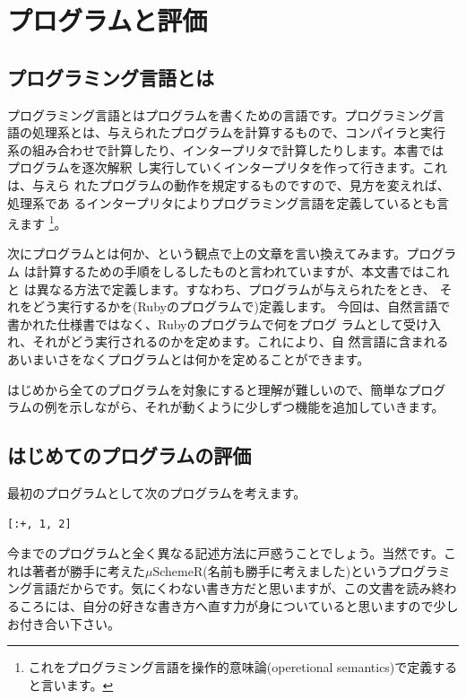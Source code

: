 \chapter{プログラムと評価\hspace{-3mm}}

\section{プログラミング言語とは}

プログラミング言語とはプログラムを書くための言語です。プログラミング言
語の処理系とは、与えられたプログラムを計算するもので、コンパイラと実行
系の組み合わせで計算したり、インタープリタで計算したりします。本書では
プログラムを逐次解釈
し実行していくインタープリタを作って行きます。これは、与えら
れたプログラムの動作を規定するものですので、見方を変えれば、処理系であ
るインタープリタによりプログラミング言語を定義しているとも言えます
\footnote{これをプログラミング言語を操作的意味論(operetional semantics)で定義すると言います。}。

次にプログラムとは何か、という観点で上の文章を言い換えてみます。プログラム
は計算するための手順をしるしたものと言われていますが、本文書ではこれと
は異なる方法で定義します。すなわち、プログラムが与えられたをとき、
それをどう実行するかを(Rubyのプログラムで)定義します。
今回は、自然言語で書かれた仕様書ではなく、Rubyのプログラムで何をプログ
ラムとして受け入れ、それがどう実行されるのかを定めます。これにより、自
然言語に含まれるあいまいさをなくプログラムとは何かを定めることができます。

はじめから全てのプログラムを対象にすると理解が難しいので、簡単なプログ
ラムの例を示しながら、それが動くように少しずつ機能を追加していきます。

\section{はじめてのプログラムの評価}

最初のプログラムとして次のプログラムを考えます。

\begin{lstlisting}
[:+, 1, 2]
\end{lstlisting}

今までのプログラムと全く異なる記述方法に戸惑うことでしょう。当然です。これは著者が勝手に考えた$\mu$SchemeR(名前も勝手に考えました)というプログラミング言語だからです。気にくわない書き方だと思いますが、この文書を読み終わるころには、自分の好きな書き方へ直す力が身についていると思いますので少しお付き合い下さい。

